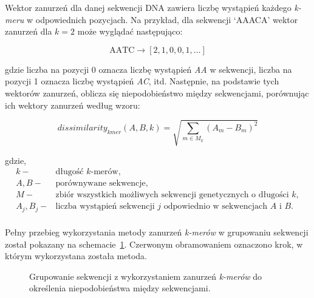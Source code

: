             Wektor zanurzeń dla danej sekwencji DNA zawiera liczbę wystąpień każdego \textit{k-meru} w odpowiednich pozycjach. Na przykład, dla sekwencji `AAACA' wektor zanurzeń dla $k=2$ może wyglądać następująco:
            
            \[
            \text{AATC} \to [2, 1, 0, 0, 1, \dots]
            \]
            
            gdzie liczba na pozycji 0 oznacza liczbę wystąpień \textit{AA} w sekwencji, liczba na pozycji 1 oznacza liczbę wystąpień \textit{AC}, itd. Następnie, na podstawie tych wektorów zanurzeń, oblicza się niepodobieństwo między sekwencjami, porównując ich wektory zanurzeń według wzoru:

            \begin{equation}
                dissimilarity_{kmer}(A, B, k) = \sqrt{\sum_{m \in M_{k}} (A_m - B_m)^{2}}
            \end{equation}

            gdzie,
            \begin{align*} 
                k -& \text{długość $k$-merów}, \\
                A, B -& \text{porównywane sekwencje}, \\
                M -& \text{zbiór wszystkich możliwych sekwencji genetycznych o długości $k$}, \\
                A_j, B_j -& \text{liczba wystąpień sekwencji } j \text{ odpowiednio w sekwencjach } A \text{ i } B. \\
            \end{align*}

            Pełny przebieg wykorzystania metody zanurzeń \textit{k-merów} w grupowaniu sekwencji został pokazany na schemacie~\ref{Picture:Cluster:KMer}. Czerwonym obramowaniem oznaczono krok, w którym wykorzystana została metoda.


            \begin{figure}
                \begin{center}
                    
                \end{center}
                \caption{
                    Grupowanie sekwencji z wykorzystaniem zanurzeń \textit{k-merów} do określenia niepodobieństwa między sekwencjami.
                }\label{Picture:Cluster:KMer}
            \end{figure}

